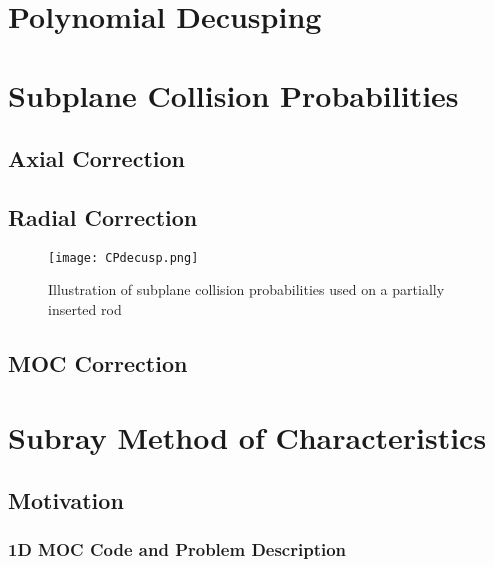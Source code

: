 \section{Polynomial Decusping}

\section{Subplane Collision Probabilities}

\subsection{Axial Correction}

\subsection{Radial Correction}

\begin{figure}
    \centering
    \texttt{[image: CPdecusp.png]}
    \caption{Illustration of subplane collision probabilities used on a partially inserted rod}\label{f:SCPdecusping}
\end{figure}

\subsection{MOC Correction}

\section{Subray Method of Characteristics}

\subsection{Motivation}

\subsubsection{1D MOC Code and Problem Description}


